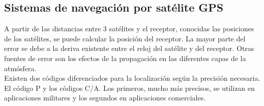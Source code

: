 	\subsection{Sistemas de navegación por satélite \acrshort{GPS}}
\label{sub:gps}
	A partir de las distancias entre 3 satélites y el receptor, conocidas las posiciones de los satélites, se puede calcular la posición del receptor. La mayor parte del error se debe a la deriva existente entre el reloj del satélite y del receptor. Otras fuentes de error son los efectos de la propagación en las diferentes capas de la atmósfera.\\
	Existen dos códigos diferenciados para la localización según la precisión necesaria. El código P y los códigos C/A. Los primeros, mucho más precisos, se utilizan en aplicaciones militares y los segundos en aplicaciones comerciales.
